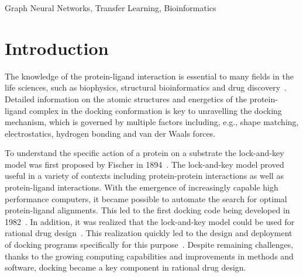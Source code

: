 \documentclass[conference]{IEEEtran}
\begin{document}
\begin{abstract}
Fast screening of drug molecules based on the ligand binding affinity is an important step in the drug discovery pipeline. Graph neural fingerprint is a promising method for developing molecular docking surrogates with high throughput and great fidelity. In this study, we built a COVID-19 drug docking dataset of about 300,000 drug candidates on 23 coronavirus protein targets. With this dataset, we trained graph neural fingerprint docking models for high-throughput virtual COVID-19 drug screening. The graph neural fingerprint models yield high prediction accuracy on docking scores with the mean squared error lower than $0.21$ kcal/mol for most of the docking targets, showing significant improvement over conventional circular fingerprint methods. To make the neural fingerprints transferable for unknown targets, we also propose a transferable graph neural fingerprint method trained on multiple targets. With comparable accuracy to target-specific graph neural fingerprint models, the training and data efficiency of the transferable model is several times higher. We highlight that the impact of this study extends beyond COVID-19 dataset, as our approach for fast virtual ligand screening can be easily adapted and integrated into a general machine learning-accelerated pipeline to battle future bio-threats.
\end{abstract}

\begin{IEEEkeywords}
Graph Neural Networks, Transfer Learning, Bioinformatics
\end{IEEEkeywords}


\section{Introduction}
The knowledge of the protein-ligand interaction is essential to many fields in the life sciences, such as biophysics, structural bioinformatics and drug discovery~\cite{sousa2006protein}. Detailed information on the atomic structures and energetics of the protein-ligand complex in the docking conformation is key to unravelling the docking mechanism, which is governed by multiple factors including, e.g., shape matching, electrostatics, hydrogen bonding and van der Waals forces. 

To understand the specific action of a protein on a substrate the lock-and-key model was first proposed by Fischer in 1894~\cite{Fischer1894}. The lock-and-key model proved useful in a variety of contexts including protein-protein interactions as well as protein-ligand interactions. With the emergence of increasingly capable high performance computers, it became possible to automate the search for optimal protein-ligand alignments. This led to the first docking code being developed in 1982~\cite{Kuntz1982}. In addition, it was realized that the lock-and-key model could be used for rational drug design~\cite{Goodford1984}. This realization quickly led to the design and deployment of docking programs specifically for this purpose~\cite{Goodford1985}. Despite remaining challenges, thanks to the growing computing capabilities and improvements in methods and software, docking became a key component in rational drug design.
\end{document}
